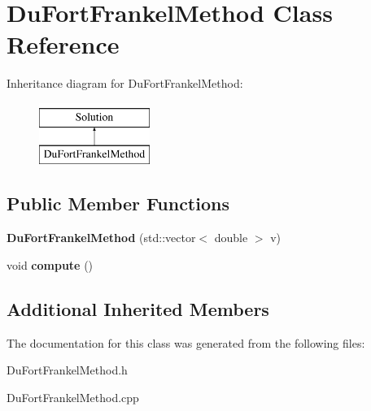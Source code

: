 \hypertarget{class_du_fort_frankel_method}{}\section{Du\+Fort\+Frankel\+Method Class Reference}
\label{class_du_fort_frankel_method}
Inheritance diagram for Du\+Fort\+Frankel\+Method\+:\begin{figure}[H]
\begin{center}
\leavevmode
\includegraphics[height=2.000000cm]{class_du_fort_frankel_method}
\end{center}
\end{figure}
\subsection*{Public Member Functions}
\begin{DoxyCompactItemize}
\item 
\mbox{\label{class_du_fort_frankel_method_a56355289a2ead5d2aa0092687804597b}} 
{\bfseries Du\+Fort\+Frankel\+Method} (std\+::vector$<$ double $>$ v)
\item 
\mbox{\label{class_du_fort_frankel_method_a68b9ad88883a71daba4c2fc92355b173}} 
void {\bfseries compute} ()
\end{DoxyCompactItemize}
\subsection*{Additional Inherited Members}


The documentation for this class was generated from the following files\+:\begin{DoxyCompactItemize}
\item 
Du\+Fort\+Frankel\+Method.\+h\item 
Du\+Fort\+Frankel\+Method.\+cpp\end{DoxyCompactItemize}
